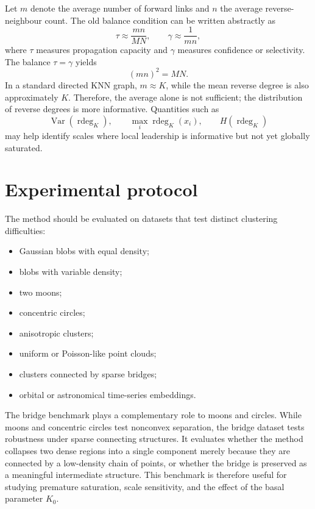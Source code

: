\documentclass[pdflatex,sn-mathphys-num]{sn-jnl}
\newcommand{\rdeg}{\operatorname{rdeg}}
\begin{document}
Let $m$ denote the average number of forward links and $n$ the average reverse-neighbour count. The old balance condition can be written abstractly as
\begin{equation}
\tau\approx \frac{mn}{MN},\qquad \gamma\approx\frac{1}{mn},
\end{equation}
where $\tau$ measures propagation capacity and $\gamma$ measures confidence or selectivity. The balance $\tau=\gamma$ yields
\begin{equation}
(mn)^2=MN.
\end{equation}
In a standard directed KNN graph, $m\approx K$, while the mean reverse degree is also approximately $K$. Therefore, the average alone is not sufficient; the distribution of reverse degrees is more informative. Quantities such as
\begin{equation}
\operatorname{Var}(\rdeg_K),\qquad \max_i\rdeg_K(x_i),\qquad H(\rdeg_K)
\end{equation}
may help identify scales where local leadership is informative but not yet globally saturated.

\section{Experimental protocol}\label{sec:experimental_protocol}

The method should be evaluated on datasets that test distinct clustering difficulties:
\begin{itemize}
    \item Gaussian blobs with equal density;
    \item blobs with variable density;
    \item two moons;
    \item concentric circles;
    \item anisotropic clusters;
    \item uniform or Poisson-like point clouds;
    \item clusters connected by sparse bridges;
    \item orbital or astronomical time-series embeddings.
\end{itemize}

The bridge benchmark plays a complementary role to moons and circles. While moons and concentric circles test nonconvex separation, the bridge dataset tests robustness under sparse connecting structures. It evaluates whether the method collapses two dense regions into a single component merely because they are connected by a low-density chain of points, or whether the bridge is preserved as a meaningful intermediate structure. This benchmark is therefore useful for studying premature saturation, scale sensitivity, and the effect of the basal parameter $K_0$.
\end{document}
